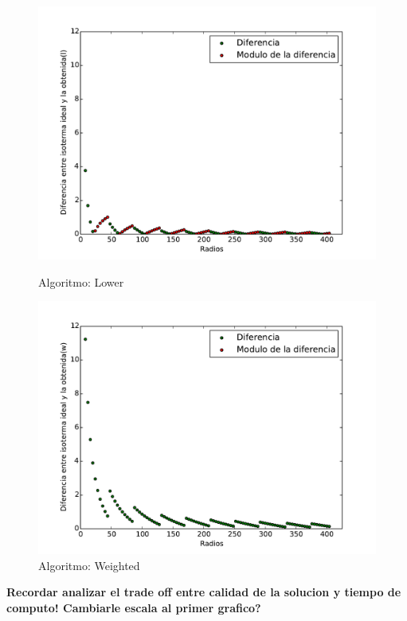 \begin{figure}[h]
  \centering
  \begin{minipage}[b]{0.49\textwidth}
    \includegraphics[width=\textwidth]{graficos/mVariable_l.pdf}
    \caption{Algoritmo: Lower}
  \end{minipage}
  \hfill
  \begin{minipage}[b]{0.49\textwidth}
    \includegraphics[width=\textwidth]{graficos/mVariable_w.pdf}
    \caption{Algoritmo: Weighted}
  \end{minipage}
\end{figure}

\textbf{Recordar analizar el trade off entre calidad de la solucion y tiempo de computo! Cambiarle escala al primer grafico?}

